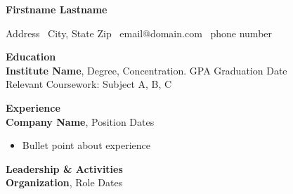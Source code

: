 \documentclass[11pt]{article}
\begin{document}
\begin{center} \textbf{Firstname Lastname} \\ \hrulefill \end{center}
\begin{center} Address \textbullet\ City, State Zip \textbullet\ email@domain.com \textbullet\ phone number \end{center}
\vspace{10pt}
\textbf{Education} \\
\textbf{Institute Name}, Degree, Concentration. GPA \hfill Graduation Date \\
Relevant Coursework: Subject A, B, C

\vspace{10pt}
\textbf{Experience} \\
\textbf{Company Name}, Position \hfill Dates \\
\begin{itemize}[noitemsep]
\item Bullet point about experience
\end{itemize}

\textbf{Leadership \& Activities} \\
\textbf{Organization}, Role \hfill Dates \\
\end{document}
